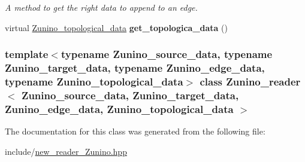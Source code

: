 \begin{DoxyCompactItemize}
\begin{DoxyCompactList}\small\item\em A method to get the right data to append to an edge. \item\end{DoxyCompactList}\item 
\hypertarget{classZunino__reader_a0c19b2f15fe48f52fc28a89717b93ab4}{
virtual \hyperlink{structZunino__topological__data}{Zunino\_\-topological\_\-data} {\bfseries get\_\-topologica\_\-data} ()}
\label{classZunino__reader_a0c19b2f15fe48f52fc28a89717b93ab4}

\end{DoxyCompactItemize}
\subsubsection*{template$<$typename Zunino\_\-source\_\-data, typename Zunino\_\-target\_\-data, typename Zunino\_\-edge\_\-data, typename Zunino\_\-topological\_\-data$>$ class Zunino\_\-reader$<$ Zunino\_\-source\_\-data, Zunino\_\-target\_\-data, Zunino\_\-edge\_\-data, Zunino\_\-topological\_\-data $>$}



The documentation for this class was generated from the following file:\begin{DoxyCompactItemize}
\item 
include/\hyperlink{new__reader__Zunino_8hpp}{new\_\-reader\_\-Zunino.hpp}\end{DoxyCompactItemize}
